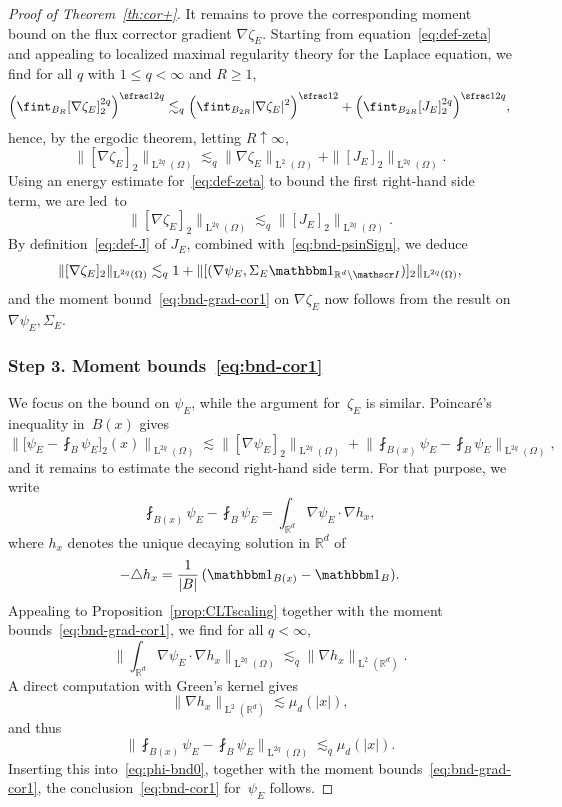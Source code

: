 \documentclass[JEP,XML,SOM,Unicode,published]{cedram}
\let\mathcal\mathscr
\let\mathds\mathbbm
\theoremstyle{plain}
\theoremstyle{definition}
\newcommand{\R}{\mathbb R}
\newcommand{\Ic}{\mathcal I}
\newcommand{\Ld}{\operatorname{L}}
\newcommand{\step}[1]{\subsubsection*{Step #1}}
\begin{document}
\begin{proof}[Proof of Theorem~\ref{th:cor+}]
It remains to prove the corresponding moment bound on the flux corrector gradient $\nabla\zeta_E$. Starting from equation~\eqref{eq:def-zeta} and appealing to localized maximal regularity theory for the Laplace equation, we find for all $q$ with $1\le q<\infty$ and $R\ge1$,
\[\Big(\fint_{B_R}[\nabla\zeta_E]_2^{2q}\Big)^{\sfrac1{2q}}\lesssim_q \Big(\fint_{B_{2R}}|\nabla\zeta_E|^{2}\Big)^{\sfrac12}+\Big(\fint_{B_{2R}}[J_E]_2^{2q}\Big)^{\sfrac1{2q}},\]
hence, by the ergodic theorem, letting $R\uparrow\infty$,
\[\|[\nabla\zeta_E]_2\|_{\Ld^{2q}(\Omega)}\lesssim_q \|\nabla\zeta_E\|_{\Ld^2(\Omega)}+\|[J_E]_2\|_{\Ld^{2q}(\Omega)}.\]
Using an energy estimate for~\eqref{eq:def-zeta} to bound the first right-hand side term, we are led~to
\[\|[\nabla\zeta_E]_2\|_{\Ld^{2q}(\Omega)}\lesssim_q \|[J_E]_2\|_{\Ld^{2q}(\Omega)}.\]
By definition~\eqref{eq:def-J} of $J_E$, combined with~\eqref{eq:bnd-psinSign}, we deduce
\[\|[\nabla\zeta_E]_2\|_{\Ld^{2q}(\Omega)}\lesssim_q 1+\|[(\nabla\psi_E,\Sigma_E\mathds1_{\R^d\setminus\Ic})]_2\|_{\Ld^{2q}(\Omega)},\]
and the moment bound~\eqref{eq:bnd-grad-cor1} on $\nabla\zeta_E$ now follows from the result on $\nabla\psi_E,\Sigma_E$.

\step{3. Moment bounds~\eqref{eq:bnd-cor1}}
We focus on the bound on $\psi_E$, while the argument for~$\zeta_E$ is similar.
Poincaré's inequality in~$B(x)$ gives
\begin{equation}\label{eq:phi-bnd0}
\bigg\|\Big[\psi_E-\fint_{B}\psi_E\Big]_2(x)\bigg\|_{\Ld^{2q}(\Omega)}\lesssim \|[\nabla\psi_E]_2\|_{\Ld^{2q}(\Omega)}+\Big\|\fint_{B(x)}\psi_E-\fint_{B}\psi_E\Big\|_{\Ld^{2q}(\Omega)},
\end{equation}
and it remains to estimate the second right-hand side term.
For that purpose, we write
\[\fint_{B(x)}\psi_E-\fint_{B}\psi_E=\int_{\R^d}\nabla\psi_E\cdot\nabla h_{x},\]
where $h_x$ denotes the unique decaying solution in $\R^d$ of
\[-\triangle h_x=\frac{1}{|B|}\,(\mathds1_{B(x)}-\mathds1_B).\]
Appealing to Proposition~\ref{prop:CLTscaling} together with the moment bounds~\eqref{eq:bnd-grad-cor1}, we find for all \mbox{$q<\infty$},
\[\Big\|\int_{\R^d}\nabla\psi_E\cdot\nabla h_{x}\Big\|_{\Ld^{2q}(\Omega)}\lesssim_q \|\nabla h_{x}\|_{\Ld^2(\R^d)}.\]
A direct computation with Green's kernel gives
\[\|\nabla h_{x}\|_{\Ld^2(\R^d)}\lesssim \mu_d(|x|),\]
and thus
\[\Big\|\fint_{B(x)}\psi_E-\fint_{B}\psi_E\Big\|_{\Ld^{2q}(\Omega)}\lesssim_q \mu_d(|x|).\]
Inserting this into~\eqref{eq:phi-bnd0}, together with the moment bounds~\eqref{eq:bnd-grad-cor1},
the conclusion~\eqref{eq:bnd-cor1} for~$\psi_E$ follows.
\end{proof}
\end{document}
